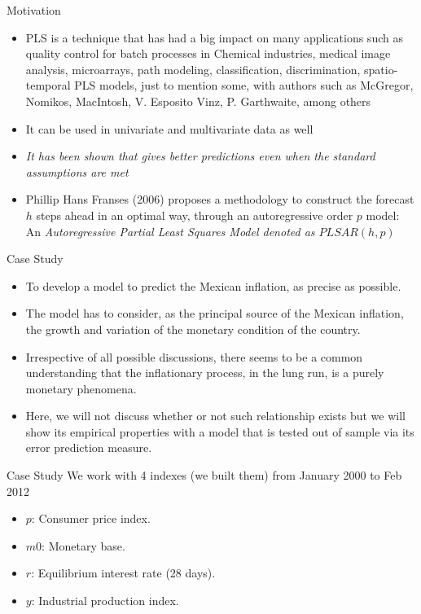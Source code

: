\documentclass{beamer}
\newcommand{\?}{?`}
\begin{document}
\begin{frame}{Motivation}
  \begin{itemize}
    \item PLS is a technique that has had a big impact on many applications such as quality control for
    batch processes in Chemical industries, medical image analysis, microarrays, path modeling,
    classification, discrimination, spatio-temporal PLS models, just to mention some, with authors such as
    McGregor, Nomikos, MacIntosh, V. Esposito Vinz, P. Garthwaite, among others
    \item It can be used in univariate and multivariate data as well
    \item {\it{It has been shown that gives better predictions even when the standard assumptions are met}}
    \item Phillip Hans Franses (2006) proposes a methodology to construct the forecast $h$ steps ahead in an
    optimal way, through an autoregressive order $p$ model:  An \it{Autoregressive Partial Least Squares Model} denoted as  $PLSAR(h,p)$
      \end{itemize}
    \end{frame}

\begin{frame}{Case Study}
  \begin{itemize}
    \item To develop a model to predict the Mexican inflation, as precise as possible.
    \item The model has to consider, as the principal source of the Mexican inflation,
    the growth and variation of the monetary condition of the country.
    \item Irrespective of all possible discussions, there seems to be a common understanding
     that the inflationary process, in the lung run, is a purely monetary phenomena.
    \item Here, we will not discuss whether or not such relationship exists
    but we will show its empirical properties with a model that is tested out of sample via its error prediction measure.

  \end{itemize}
\end{frame}

\begin{frame}{Case Study}
  We work with 4 indexes (we built them) from January 2000 to Feb 2012
  \bigskip

  \begin{itemize}
    \item $p$: Consumer price index.
    \bigskip
    \item $m0$: Monetary base.
      \bigskip
    \item $r$: Equilibrium interest rate (28 days).
      \bigskip
    \item $y$: Industrial production index.
  \end{itemize}
\end{frame}
\end{document}
